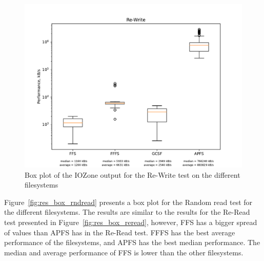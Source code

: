 \begin{figure}[!ht]
	\label{fig:res_box_rewrite}
	\begin{center}
		\includegraphics[width=1.0\textwidth]{figures.nosync/benchmarking/Re-Write_box.pdf}
	\end{center}
	\caption{Box plot of the IOZone output for the Re-Write test on the different filesystems}
\end{figure}

\FloatBarrier

Figure~\ref{fig:res_box_rndread} presents a box plot for the Random read test for the different filesystems. The results are similar to the results for the \mbox{Re-Read} test presented in Figure~\ref{fig:res_box_reread}, however, \gls{FFS} has a bigger spread of values than \gls{APFS} has in the \mbox{Re-Read} test. \gls{FFFS} has the best average performance of the filesystems, and \gls{APFS} has the best median performance. The median and average performance of \gls{FFS} is lower than the other filesystems.

